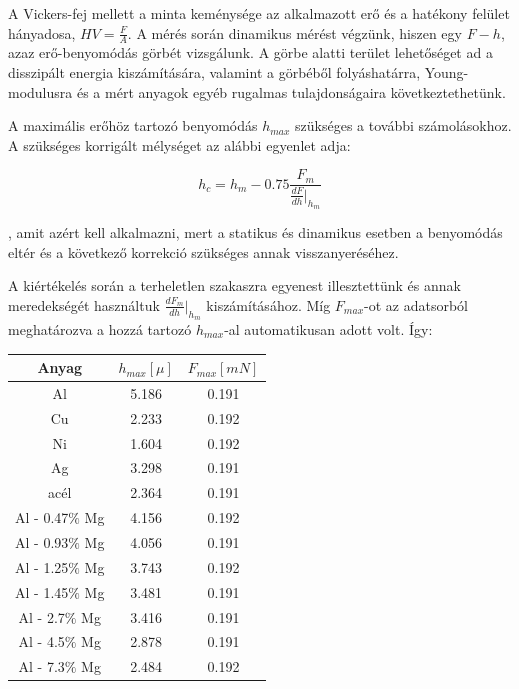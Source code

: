 \documentclass[a4paper,12pt]{article}
\begin{document}
\par A Vickers-fej mellett a minta keménysége az alkalmazott erő és a hatékony felület hányadosa, $HV = \frac{F}{A}$. A mérés során dinamikus mérést végzünk, hiszen egy $F-h$, azaz erő-benyomódás görbét vizsgálunk. A görbe alatti terület lehetőséget ad a disszipált energia kiszámítására, valamint a görbéből folyáshatárra, Young-modulusra és a mért anyagok egyéb rugalmas tulajdonságaira következtethetünk. 

\vspace{5mm}

\par A maximális erőhöz tartozó benyomódás $h_{max}$ szükséges a további számolásokhoz. A szükséges korrigált mélységet az alábbi egyenlet adja:

\begin{equation*}
h_{c} = h_{m} - 0.75\frac{F_{m}}{\frac{dF}{dh}|_{h_{m}}}
\end{equation*}

\par , amit azért kell alkalmazni, mert a statikus és dinamikus esetben a benyomódás eltér és a következő korrekció szükséges annak visszanyeréséhez. 

\par A kiértékelés során a terheletlen szakaszra egyenest illesztettünk és annak meredekségét használtuk $\frac{dF_{m}}{dh}|_{h_{m}}$ kiszámításához. Míg $F_{max}$-ot az adatsorból meghatározva a hozzá tartozó $h_{max}$-al automatikusan adott volt. Így:

\begin{center}
\begin{tabular}{|c|c|c|}
\hline
Anyag & $h_{max} [\mu]$ & $F_{max} [mN]$ \\
\hline
Al &5.186 &0.191 \\
\hline
Cu &2.233 &0.192 \\
\hline
Ni &1.604 &0.192 \\
\hline
Ag& 3.298& 0.191 \\
\hline
acél &2.364& 0.191 \\
\hline
Al - 0.47$\%$ Mg &  4.156& 0.192 \\
\hline
Al - 0.93$\%$ Mg& 4.056& 0.191 \\
\hline
Al - 1.25$\%$ Mg& 3.743& 0.192 \\
\hline
Al - 1.45$\%$ Mg &3.481& 0.191 \\
\hline
Al - 2.7$\%$ Mg &3.416& 0.191 \\
\hline
Al - 4.5$\%$ Mg &2.878& 0.191 \\
\hline
Al - 7.3$\%$ Mg &2.484& 0.192 \\
\hline
\end{tabular}
\end{center}
\end{document}
